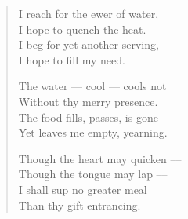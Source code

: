 \begin{verse}
  I reach for the ewer of water,\\
  I hope to quench the heat.\\
  I beg for yet another serving,\\
  I hope to fill my need.

  The water --- cool --- cools not\\
  Without thy merry presence.\\
  The food fills, passes, is gone ---\\
  Yet leaves me empty, yearning.

  Though the heart may quicken –--\\
  Though the tongue may lap –--\\
  I shall sup no greater meal\\
  Than thy gift entrancing.
\end{verse}
